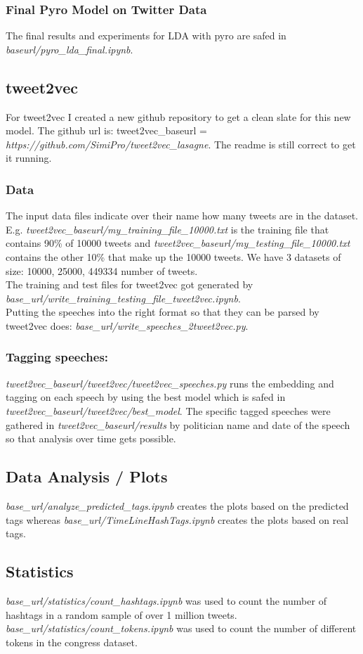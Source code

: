 \documentclass[10pt,conference,compsocconf]{IEEEtran}
\begin{document}
\subsubsection{Final Pyro Model on Twitter Data}
The final results and experiments for LDA with pyro are safed in \textit{baseurl/pyro\_lda\_final.ipynb}.

\subsection{tweet2vec}
For tweet2vec I created a new github repository to get a clean slate for this new model. The github url is: tweet2vec\_baseurl = \textit{https://github.com/SimiPro/tweet2vec\_lasagne}. The readme is still correct to get it running.
\subsubsection{Data}
 The input data files indicate over their name how many tweets are in the dataset. E.g. \textit{tweet2vec\_baseurl/my\_training\_file\_10000.txt} is the training file that contains 90\% of 10000 tweets and \textit{tweet2vec\_baseurl/my\_testing\_file\_10000.txt} contains the other 10\% that make up the 10000 tweets. We have 3 datasets of size: 10000, 25000, 449334 number of tweets. \\
 The training and test files for tweet2vec got generated by \textit{base\_url/write\_training\_testing\_file\_tweet2vec.ipynb}.\\
 Putting the speeches into the right format so that they can be parsed by tweet2vec does: \textit{base\_url/write\_speeches\_2tweet2vec.py}.

\subsubsection{Tagging speeches:}
\textit{tweet2vec\_baseurl/tweet2vec/tweet2vec\_speeches.py} runs the embedding and tagging on each speech by using the best model which is safed in \textit{tweet2vec\_baseurl/tweet2vec/best\_model}. The specific tagged speeches were gathered in \textit{tweet2vec\_baseurl/results} by politician name and date of the speech so that analysis over time gets possible.

\subsection{Data Analysis / Plots}
 \textit{base\_url/analyze\_predicted\_tags.ipynb} creates the plots based on the predicted tags whereas  \textit{base\_url/TimeLineHashTags.ipynb} creates the plots based on real tags. 
 
\subsection{Statistics}
\textit{base\_url/statistics/count\_hashtags.ipynb} was used to count the number of hashtags in a random sample of over 1 million tweets. 
\textit{base\_url/statistics/count\_tokens.ipynb} was used to count the number of different tokens in the congress dataset. 






\end{document}
